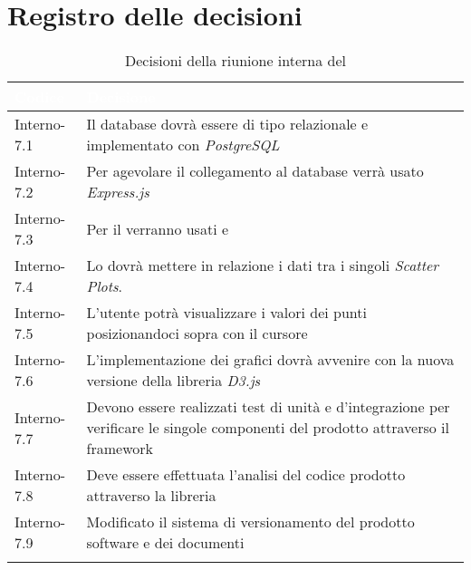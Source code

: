 \section{Registro delle decisioni}
{
\renewcommand{\arraystretch}{1.5}
\centering
\begin{longtable}{C{3cm} C{9cm}}
\textcolor{white}{\textbf{Codice}}&
\textcolor{white}{\textbf{Decisione}}\\	

\endhead
		
Interno-7.1 & Il database dovrà essere di tipo relazionale e implementato con \textit{PostgreSQL}\\
Interno-7.2 & Per agevolare il collegamento al database verrà usato \textit{Express.js}\\
Interno-7.3 & Per il  verranno usati \textit{} e \textit{}\\
Interno-7.4 & Lo \textit{} dovrà mettere in relazione i dati tra i singoli \textit{Scatter Plots}.\\
Interno-7.5 & L'utente potrà visualizzare i valori dei punti posizionandoci sopra con il cursore\\
Interno-7.6 & L'implementazione dei grafici dovrà avvenire con la nuova versione della libreria \textit{D3.js}\\
Interno-7.7 & Devono essere realizzati test di unità e d'integrazione per
verificare le singole componenti del prodotto attraverso il framework \textit{}\\
Interno-7.8 & Deve essere effettuata l'analisi del codice prodotto attraverso la libreria \textit{}\\
Interno-7.9 & Modificato il sistema di versionamento del prodotto software e dei documenti\\
\caption{Decisioni della riunione interna del \Data{}}
\end{longtable}
}

